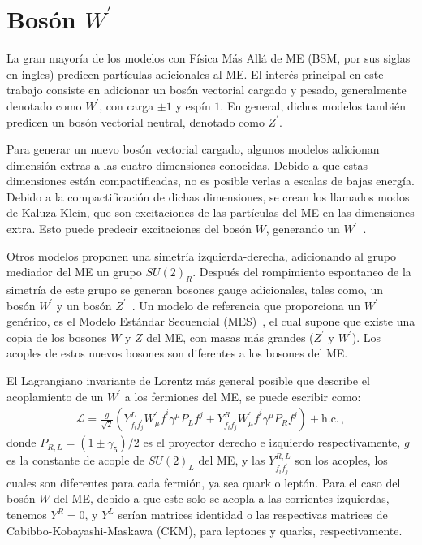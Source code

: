 \chapter{Bosón $W^{\prime}$}\label{Ch:W-prime}
La gran mayoría de los modelos con Física Más Allá de ME (BSM, por sus siglas en ingles) predicen  partículas adicionales al ME. El interés principal en este trabajo consiste en adicionar un bosón vectorial cargado y pesado, generalmente denotado como $W^{\prime}$, con carga $\pm 1$ y espín $1$. En general, dichos modelos también predicen un bosón vectorial neutral, denotado como $Z^{\prime}$. 

Para generar un nuevo bosón vectorial cargado, algunos modelos adicionan dimensión extras a las cuatro dimensiones conocidas. Debido a que estas dimensiones están compactificadas, no es posible verlas a escalas de bajas energía.  Debido a la compactificación de dichas dimensiones, se crean los llamados modos de Kaluza-Klein, que son excitaciones de las partículas del ME en las dimensiones extra. Esto puede predecir excitaciones del  bosón $W$, generando un $W^{\prime}$~\cite{Chen:2009gz, Kong:2010xk}.

Otros modelos proponen una simetría izquierda-derecha, adicionando al grupo mediador del ME un grupo $SU (2)_R$. Después del rompimiento espontaneo de la simetría de este grupo se generan bosones gauge adicionales, tales como, un bosón $W^{\prime}$ y un bosón $Z^{\prime}$~\cite{Boucenna:2016wpr}. Un modelo de referencia que proporciona un $W^{\prime}$ genérico, es el Modelo Estándar Secuencial (MES)~\cite{Altarelli:1989ff}, el cual supone que existe una copia de los bosones $W$ y $Z$ del ME, con masas más grandes ($Z^{\prime}$ y $W^{\prime}$). Los acoples de estos nuevos bosones son diferentes a los bosones del ME.

El Lagrangiano invariante de Lorentz más general posible que describe el acoplamiento de un $W^{\prime}$ a los fermiones del ME, se puede escribir como:
\begin{align}\label{Eq:Lag}
\mathcal{L} = \frac{g}{\sqrt{2}} (Y^{L}_{f_i f^{\prime}_j} W^{\prime}_{\mu} \bar{f}^{i} \gamma^{\mu} P_L f^{j} + Y^{R}_{f_i f^{\prime}_j} W^{\prime}_{\mu} \bar{f}^{i} \gamma^{\mu} P_R f^{j} ) + \text{h.c.}\,,
\end{align}
donde $P_{R,L} = (1 \pm \gamma_5)/2$ es el proyector derecho e izquierdo respectivamente, $g$ es la constante de acople de $SU(2)_L$ del ME, y las $Y^{R,L}_{f_i f^{\prime}_j}$ son los acoples, los cuales son diferentes para cada fermión, ya sea quark o leptón. Para el caso del bosón $W$ del ME, debido a que este solo se acopla a las corrientes izquierdas, tenemos $Y^{R} = 0$, y $Y^{L}$ serían matrices identidad o las respectivas matrices de Cabibbo-Kobayashi-Maskawa (CKM), para leptones y quarks, respectivamente.


